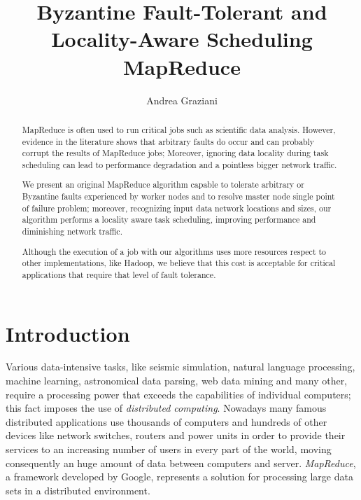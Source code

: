 \documentclass[sigchi]{acmart}
\begin{document}
\title{Byzantine Fault-Tolerant and Locality-Aware Scheduling MapReduce}

\author{Andrea Graziani}

\renewcommand{\shortauthors}{Andrea Graziani (0273395)}

\begin{abstract}
MapReduce is often used to run critical jobs such as scientific data analysis. However, evidence in the literature shows that arbitrary faults do occur and can probably corrupt the results of MapReduce jobs; Moreover, ignoring data locality during task scheduling can lead to performance degradation and a pointless bigger network traffic.

We present an original MapReduce algorithm capable to tolerate arbitrary or Byzantine faults experienced by worker nodes and to resolve master node single point of failure problem; moreover, recognizing input data network locations and sizes, our algorithm performs a locality aware task scheduling, improving performance and diminishing network traffic.

Although the execution of a job with our algorithms uses more resources respect to other implementations, like Hadoop, we believe that this cost is acceptable for critical applications that require that level of fault tolerance.
\end{abstract}



\maketitle

\section{Introduction}

Various data-intensive tasks, like seismic simulation, natural language processing, machine learning, astronomical data parsing, web data mining and many other, require a processing power that exceeds the capabilities of individual computers; this fact imposes the use of \textit{distributed computing}. Nowadays many famous distributed applications use thousands of computers and hundreds of other devices like network switches, routers and power units in order to provide their services to an increasing number of users in every part of the world, moving consequently an huge amount of data between computers and server. \textit{MapReduce}, a framework developed by Google, represents a solution for processing large data sets in a distributed environment. 
\end{document}
